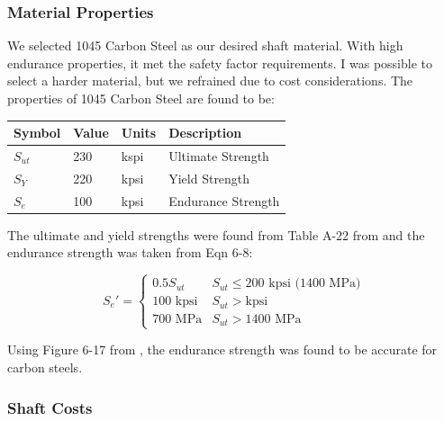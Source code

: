 \documentclass[letterpaper,12pt]{article}
\begin{document}
\subsubsection{Material Properties}

We selected 1045 Carbon Steel as our desired shaft material. With high endurance properties, it met the safety factor requirements. I was possible to select a harder material, but we refrained due to cost considerations. The properties of 1045 Carbon Steel are found to be:

\begin{center}
	\begin{tabular}{ |p{1.5cm}||p{1cm}|p{2cm}|p{7cm}|  }
		\hline
		Symbol & Value & Units & Description\\
		\hline
		$S_{ut}$ & 230 & kspi & Ultimate Strength\\
        $S_Y$ & 220 & kpsi  & Yield Strength\\			
		$S_e$ & 100 & kpsi  & Endurance Strength\\
		\hline
	\end{tabular}
\end{center}

The ultimate and yield strengths were found from Table A-22 from \cite{shigley} and the endurance strength was taken from Eqn 6-8:

\begin{equation}
    S_e' = 
    \begin{cases}
    0.5S_{ut} & S_{ut} \leq 200 \text{ kpsi (1400 MPa)}\\
    100 \text{ kpsi} & S_{ut} > \text{kpsi}\\
    700 \text{ MPa} & S_{ut} > 1400 \text{ MPa}
    \end{cases}
\end{equation}

Using Figure 6-17 from \cite{shigley}, the endurance strength was found to be accurate for carbon steels.

\subsubsection{Shaft Costs}
\end{document}
